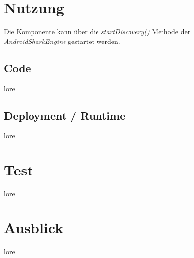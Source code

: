 \section{Nutzung}
Die Komponente kann über die \textit{startDiscovery()} Methode der \textit{AndroidSharkEngine} gestartet werden.

\subsection{Code}
lore

\subsection{Deployment / Runtime}
lore


\section{Test}
lore


\section{Ausblick}
lore 